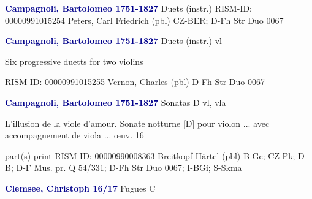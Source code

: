 \documentclass[twocolumn]{book}
\begin{document}
\newline \par \vspace{7pt} \textcolor{darkblue}{\textbf{Campagnoli, Bartolomeo  1751-1827}}
\newline Duets (instr.)    
\newline RISM-ID: 00000991015254
\newline Peters, Carl Friedrich  (pbl)
\newline CZ-BER; D-Fh  Str Duo 0067
\newline \par \vspace{7pt} \textcolor{darkblue}{\textbf{Campagnoli, Bartolomeo  1751-1827}}
\newline Duets (instr.)    
 vl
\newline \begin{itshape}Six progressive duetts for two violins\end{itshape} 
\newline RISM-ID: 00000991015255
\newline Vernon, Charles  (pbl)
\newline D-Fh  Str Duo 0067
\newline \par \vspace{7pt} \textcolor{darkblue}{\textbf{Campagnoli, Bartolomeo  1751-1827}}
\newline Sonatas  D  
\newline vl, vla
\newline \begin{itshape}L'illusion de la viole d'amour. Sonate notturne [D] pour violon ... avec accompagnement de viola ... œuv. 16\end{itshape} 
\newline \textcolor{darkblue}{}  part(s)  
\newline print
\newline RISM-ID: 00000990008363
\newline Breitkopf  Härtel  (pbl)
\newline B-Gc; CZ-Pk; D-B; D-F  Mus. pr. Q 54/331; D-Fh  Str Duo 0067; I-BGi; S-Skma
\newline \par \vspace{7pt} \textcolor{darkblue}{\textbf{Clemsee, Christoph  16/17}}
\newline Fugues  C  
\end{document}
